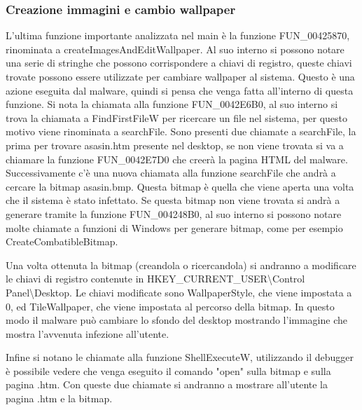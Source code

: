 \documentclass[a4paper,12pt]{article}
\begin{document}
\subsubsection{Creazione immagini e cambio wallpaper}
L'ultima funzione importante analizzata nel main è la funzione FUN\_00425870, rinominata a createImagesAndEditWallpaper. Al suo interno si possono notare una serie di stringhe che possono corrispondere a chiavi di registro, queste chiavi trovate possono essere utilizzate per cambiare wallpaper al sistema. Questo è una azione eseguita dal malware, quindi si pensa che venga fatta all'interno di questa funzione. Si nota la chiamata alla funzione FUN\_0042E6B0, al suo interno si trova la chiamata a FindFirstFileW per ricercare un file nel sistema, per questo motivo viene rinominata a searchFile. Sono presenti due chiamate a searchFile, la prima per trovare asasin.htm presente nel desktop, se non viene trovata si va a chiamare la funzione FUN\_0042E7D0 che creerà la pagina HTML del malware. Successivamente c'è una nuova chiamata alla funzione searchFile che andrà a cercare la bitmap asasin.bmp. Questa bitmap è quella che viene aperta una volta che il sistema è stato infettato. Se questa bitmap non viene trovata si andrà a generare tramite la funzione FUN\_004248B0, al suo interno si possono notare molte chiamate a funzioni di Windows per generare bitmap, come per esempio CreateCombatibleBitmap. 

Una volta ottenuta la bitmap (creandola o ricercandola) si andranno a modificare le chiavi di registro contenute in  HKEY\_CURRENT\_USER\textbackslash Control Panel\textbackslash Desktop. Le chiavi modificate sono WallpaperStyle, che viene impostata a 0, ed TileWallpaper, che viene impostata al percorso della bitmap. In questo modo il malware può cambiare lo sfondo del desktop mostrando l'immagine che mostra l'avvenuta infezione all'utente. 

Infine si notano le chiamate alla funzione ShellExecuteW, utilizzando il debugger è possibile vedere che venga eseguito il comando "open" sulla bitmap e sulla pagina .htm. Con queste due chiamate si andranno a mostrare all'utente la pagina .htm e la bitmap.
\end{document}

